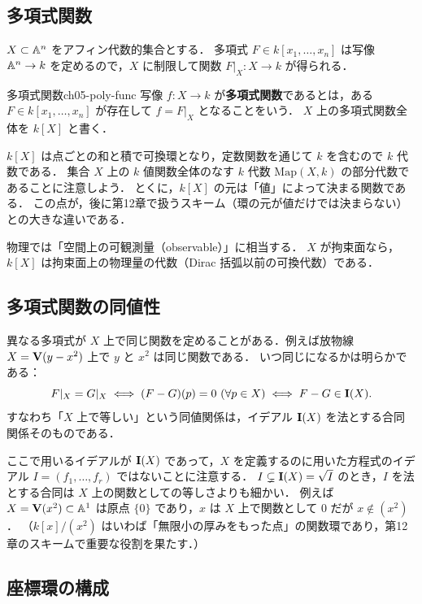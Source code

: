 \subsection{多項式関数}

$X\subset \mathbb{A}^n$ をアフィン代数的集合とする．
多項式 $F\in k[x_1,\dots,x_n]$ は写像 $\mathbb{A}^n\to k$ を定めるので，$X$ に制限して関数 $F|_X:X\to k$ が得られる．

\begin{mydef}{多項式関数}{ch05-poly-func}
写像 $f:X\to k$ が\textbf{多項式関数}であるとは，ある $F\in k[x_1,\dots,x_n]$ が存在して $f=F|_X$ となることをいう．
$X$ 上の多項式関数全体を $k[X]$ と書く．
\end{mydef}

$k[X]$ は点ごとの和と積で可換環となり，定数関数を通じて $k$ を含むので $k$ 代数である．
集合 $X$ 上の $k$ 値関数全体のなす $k$ 代数 $\mathrm{Map}(X,k)$ の部分代数であることに注意しよう．
とくに，$k[X]$ の元は「値」によって決まる関数である．
この点が，後に第12章で扱うスキーム（環の元が値だけでは決まらない）との大きな違いである．

物理では「空間上の可観測量（observable）」に相当する．
$X$ が拘束面なら，$k[X]$ は拘束面上の物理量の代数（Dirac 括弧以前の可換代数）である．

\subsection{多項式関数の同値性}

異なる多項式が $X$ 上で同じ関数を定めることがある．例えば放物線 $X=\mathbf{V}(y-x^2)$ 上で $y$ と $x^2$ は同じ関数である．
いつ同じになるかは明らかである：
\[
  F|_X=G|_X\iff (F-G)(p)=0\ (\forall p\in X)\iff F-G\in\mathbf{I}(X).
\]
すなわち「$X$ 上で等しい」という同値関係は，イデアル $\mathbf{I}(X)$ を法とする合同関係そのものである．

ここで用いるイデアルが $\mathbf{I}(X)$ であって，$X$ を定義するのに用いた方程式のイデアル $I=(f_1,\dots,f_r)$ ではないことに注意する．
$I\subsetneq \mathbf{I}(X)=\sqrt{I}$ のとき，$I$ を法とする合同は $X$ 上の関数としての等しさよりも細かい．
例えば $X=\mathbf{V}(x^2)\subset\mathbb{A}^1$ は原点 $\{0\}$ であり，$x$ は $X$ 上で関数として $0$ だが $x\notin(x^2)$．
（$k[x]/(x^2)$ はいわば「無限小の厚みをもった点」の関数環であり，第12章のスキームで重要な役割を果たす．）

\subsection{座標環の構成}

